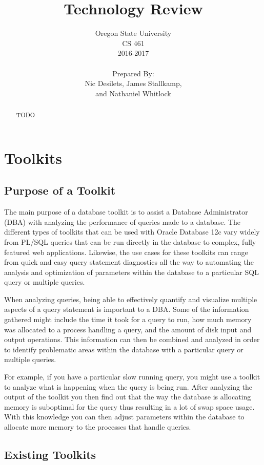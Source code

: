 \documentclass[draftclsnofoot, onecolumn, compsoc, 10pt]{IEEEtran}
\title{\huge Technology Review}
\author{Oregon State University\\CS 461\\2016-2017\\\\Prepared By:\\Nic Desilets, James Stallkamp,\\and Nathaniel Whitlock}
\begin{document}
\begin{titlingpage}
    \maketitle 
    \begin{abstract}
		\noindent TODO
    \end{abstract}
\end{titlingpage}

\tableofcontents
\pagebreak

\section{Toolkits}
\subsection{Purpose of a Toolkit}
The main purpose of a database toolkit is to assist a Database Administrator (DBA) with analyzing the performance of queries made to a database. 
The different types of toolkits that can be used with Oracle Database 12c vary widely from PL/SQL queries that can be run directly in the database to complex, fully featured web applications. 
Likewise, the use cases for these toolkits can range from quick and easy query statement diagnostics all the way to automating the analysis and optimization of parameters within the database to a particular SQL query or multiple queries. 

When analyzing queries, being able to effectively quantify and visualize multiple aspects of a query statement is important to a DBA. 
Some of the information gathered might include the time it took for a query to run, how much memory was allocated to a process handling a query, and the amount of disk input and output operations. 
This information can then be combined and analyzed in order to identify problematic areas within the database with a particular query or multiple queries. 

For example, if you have a particular slow running query, you might use a toolkit to analyze what is happening when the query is being run. 
After analyzing the output of the toolkit you then find out that the way the database is allocating memory is suboptimal for the query thus resulting in a lot of swap space usage.
With this knowledge you can then adjust parameters within the database to allocate more memory to the processes that handle queries.

\subsection{Existing Toolkits}
\end{document}
